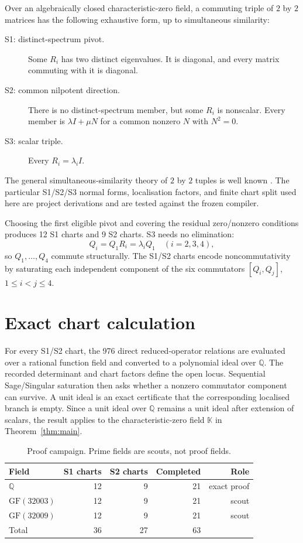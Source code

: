 \documentclass[11pt]{article}
\theoremstyle{remark}
\theoremstyle{plain}
\newcommand{\QQ}{\mathbb{Q}}
\newcommand{\KK}{\mathbb{K}}
\begin{document}
Over an algebraically closed characteristic-zero field, a commuting triple
of \(2\) by \(2\) matrices has the following exhaustive form, up to
simultaneous similarity:
\begin{description}
  \item[S1: distinct-spectrum pivot.] Some \(R_i\) has two distinct
  eigenvalues.  It is diagonal, and every matrix commuting with it is
  diagonal.
  \item[S2: common nilpotent direction.] There is no distinct-spectrum
  member, but some \(R_i\) is nonscalar.  Every member is
  \(\lambda I+\mu N\) for a common nonzero \(N\) with \(N^2=0\).
  \item[S3: scalar triple.] Every \(R_i=\lambda_i I\).
\end{description}
The general simultaneous-similarity theory of \(2\) by \(2\) tuples is
well known \cite{Florentino2009,Florentino2006}.  The particular
S1/S2/S3 normal forms, localisation factors, and finite chart split used
here are project derivations and are tested against the frozen compiler.

Choosing the first eligible pivot and covering the residual zero/nonzero
conditions produces 12 S1 charts and 9 S2 charts.  S3 needs no elimination:
\[
  Q_i=Q_1R_i=\lambda_iQ_1\quad(i=2,3,4),
\]
so \(Q_1,\ldots,Q_4\) commute structurally.  The S1/S2 charts encode
noncommutativity by saturating each independent component of the six
commutators \([Q_i,Q_j]\), \(1\leq i<j\leq4\).

\section{Exact chart calculation}

For every S1/S2 chart, the 976 direct reduced-operator relations are
evaluated over a rational function field and converted to a polynomial
ideal over \(\QQ\).  The recorded determinant and chart factors define
the open locus.  Sequential Sage/Singular saturation then asks whether a
nonzero commutator component can survive.  A unit ideal is an exact
certificate that the corresponding localised branch is empty.  Since a
unit ideal over \(\QQ\) remains a unit ideal after extension of scalars,
the result applies to the characteristic-zero field \(\KK\) in
Theorem~\ref{thm:main}.

\begin{table}[ht]
\centering
\caption{Proof campaign.  Prime fields are scouts, not proof fields.}
\label{tab:campaign}
\begin{tabular}{lrrrr}
\toprule
Field & S1 charts & S2 charts & Completed & Role\\
\midrule
\(\QQ\)       & 12 & 9 & 21 & exact proof\\
\(\mathrm{GF}(32003)\) & 12 & 9 & 21 & scout\\
\(\mathrm{GF}(32009)\) & 12 & 9 & 21 & scout\\
\midrule
Total & 36 & 27 & 63 & \\
\bottomrule
\end{tabular}
\end{table}
\end{document}
